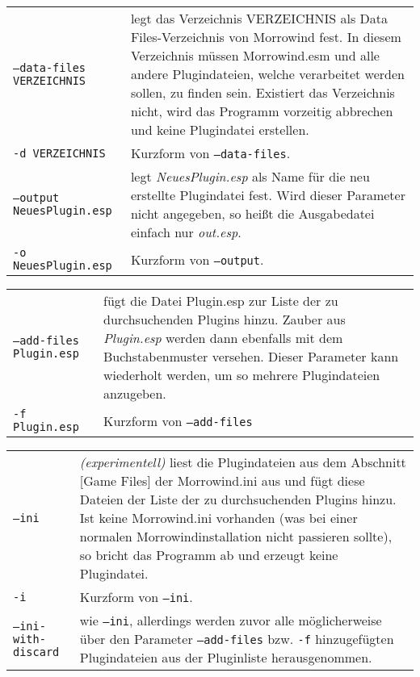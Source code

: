 \documentclass[12pt,oneside,a4paper]{article}
\begin{document}
\begin{tabular}{p{7cm} p{8cm}}
\texttt{--data-files VERZEICHNIS} & legt das Verzeichnis VERZEICHNIS als Data Files-Verzeichnis von Morrowind fest. In diesem Verzeichnis m\"{u}ssen Morrowind.esm und alle andere Plugindateien, welche verarbeitet werden sollen, zu finden sein. Existiert das Verzeichnis nicht, wird das Programm vorzeitig abbrechen und keine Plugindatei erstellen.\\
\texttt{-d VERZEICHNIS}           & Kurzform von \texttt{--data-files}.\\
\texttt{--output NeuesPlugin.esp} & legt \textit{NeuesPlugin.esp} als Name f\"{u}r die neu erstellte Plugindatei fest. Wird dieser Parameter nicht angegeben, so heißt die Ausgabedatei einfach nur \textit{out.esp}.\\
\texttt{-o NeuesPlugin.esp}       & Kurzform von \texttt{--output}.\\
\end{tabular}
\newline
\begin{tabular}{p{7cm} p{8cm}}
\texttt{--add-files Plugin.esp}   & f\"{u}gt die Datei Plugin.esp zur Liste der zu durchsuchenden Plugins hinzu. Zauber aus \textit{Plugin.esp} werden dann ebenfalls mit dem Buchstabenmuster versehen. Dieser Pa\-ra\-me\-ter kann wiederholt werden, um so mehrere Plugindateien anzugeben.\\
\texttt{-f Plugin.esp}            & Kurzform von \texttt{--add-files}\\
\end{tabular}
\newline
\begin{tabular}{p{7cm} p{8cm}}
\texttt{--ini}                    & \textit{(experimentell)} liest die Plugindateien aus dem Abschnitt [Game Files] der Morrowind.ini aus und f\"{u}gt diese Dateien der Liste der zu durchsuchenden Plugins hinzu. Ist keine Morrowind.ini vorhanden (was bei einer normalen Morrowindinstallation nicht passieren sollte), so bricht das Programm ab und erzeugt keine Plugindatei.\\
\texttt{-i}                       & Kurzform von \texttt{--ini}.\\
\texttt{--ini-with-discard}       & wie \texttt{--ini}, allerdings werden zuvor alle m\"{o}glicherweise \"{u}ber den Parameter \texttt{--add-files} bzw. \texttt{-f} hinzugef\"{u}gten Plugindateien aus der Pluginliste herausgenommen.\\
\end{tabular}
\newline
\end{document}
